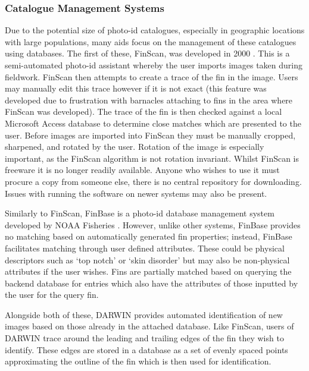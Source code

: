 {
}

\subsubsection{Catalogue Management Systems}\label{ch:Background,sec:conTech,sub:photoIDAides,subsub:databases}

Due to the potential size of photo-id catalogues, especially in geographic locations with large populations, many aids focus on the management of these catalogues using databases. The first of these, FinScan, was developed in 2000 \cite{hillman_finscan_2002}. This is a semi-automated photo-id assistant whereby the user imports images taken during fieldwork. FinScan then attempts to create a trace of the fin in the image. Users may manually edit this trace however if it is not exact (this feature was developed due to frustration with barnacles attaching to fins in the area where FinScan was developed). The trace of the fin is then checked against a local Microsoft Access database to determine close matches which are presented to the user. Before images are imported into FinScan they must be manually cropped, sharpened, and rotated by the user. Rotation of the image is especially important, as the FinScan algorithm is not rotation invariant. Whilst FinScan is freeware it is no longer readily available. Anyone who wishes to use it must procure a copy from someone else, there is no central repository for downloading. Issues with running the software on newer systems may also be present.

Similarly to FinScan, FinBase is a photo-id database management system developed by NOAA Fisheries \cite{fisheries_finbase_2018}. However, unlike other systems, FinBase provides no matching based on automatically generated fin properties; instead, FinBase facilitates matching through user defined attributes. These could be physical descriptors such as `top notch' or `skin disorder' but may also be non-physical attributes if the user wishes. Fins are partially matched based on querying the backend database for entries which also have the attributes of those inputted by the user for the query fin. 

Alongside both of these, DARWIN \cite{hale_unsupervised_2012} provides automated identification of new images based on those already in the attached database. Like FinScan, users of DARWIN trace around the leading and trailing edges of the fin they wish to identify. These edges are stored in a database as a set of evenly spaced points approximating the outline of the fin which is then used for identification.

